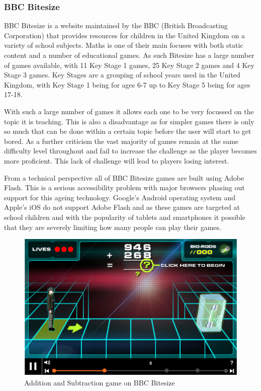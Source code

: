 \documentclass[12pt,a4paper]{report}
\begin{document}
\subsubsection{BBC Bitesize}
BBC Bitesize is a website maintained by the BBC (British Broadcasting Corporation) that provides resources for children in the United Kingdom on a variety of school subjects. Maths is one of their main focuses with both static content and a number of educational games. As such Bitesize has a large number of games available, with 11 Key Stage 1 games, 25 Key Stage 2 games and 4 Key Stage 3 games. Key Stages are a grouping of school years used in the United Kingdom, with Key Stage 1 being for ages 6-7 up to Key Stage 5 being for ages 17-18.

With such a large number of games it allows each one to be very focussed on the topic it is teaching. This is also a disadvantage as for simpler games there is only so much that can be done within a certain topic before the user will start to get bored. As a further criticism the vast majority of games remain at the same difficulty level throughout and fail to increase the challenge as the player becomes more proficient. This lack of challenge will lead to players losing interest. 

From a technical perspective all of BBC Bitesize games are built using Adobe Flash. This is a serious accessibility problem with major browsers phasing out support for this ageing technology. Google's Android operating system and Apple's iOS do not support Adobe Flash  and as these games are targeted at school children and with the popularity of tablets and smartphones it possible that they are severely limiting how many people can play their games.

\begin{figure}[!tbp]
  \centering
  \begin{minipage}[b]{1\textwidth}
    \includegraphics[width=\textwidth]{BBCBitesize}
    \caption{Addition and Subtraction game on BBC Bitesize}
  \end{minipage}
\end{figure}
\FloatBarrier
\end{document}
